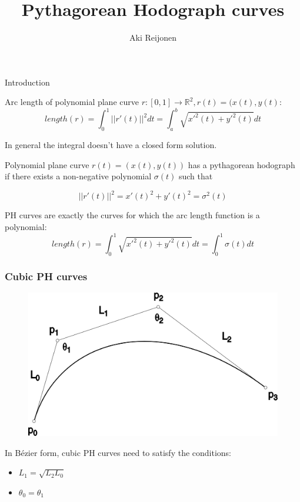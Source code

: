 \documentclass{beamer}
\title{Pythagorean Hodograph curves}
\author{Aki Reijonen}
\begin{document}
\begin{frame}
\titlepage
\end{frame}


%
\begin{frame}{Introduction}

Arc length of polynomial plane curve $r : [0,1] \to \mathbb{R}^2, r(t) = (x(t), y(t)$:
\[
  length(r) = 
\int_0^1 ||r'(t)||^2 dt = \int_a^b \sqrt{x'^2(t) + y'^2(t)} dt
\]

In general the integral doesn't have a closed form solution.

\end{frame}

\begin{frame}

\begin{definition}
Polynomial plane curve $r(t)=(x(t), y(t))$ has a pythagorean hodograph if 
there exists a non-negative polynomial $\sigma(t)$ such that

\[
  ||r'(t)||^2 = x'(t)^2 + y'(t)^2 = \sigma^2(t)
\]
\end{definition}
\pause

PH curves are exactly the curves for which the arc length function is a polynomial:
\[
  length(r) = \int_0^1 \sqrt{x'^2(t) + y'^2(t)} dt = \int_0^1 \sigma(t) dt
\]

\end{frame}

\begin{frame}
\frametitle{Cubic PH curves}

\begin{figure}
\centering
\includegraphics[width=\textwidth]{cubic_ph_bezier.png}
\end{figure}

In Bézier form, cubic PH curves need to satisfy the conditions:
\begin{itemize}
\item $L_1 = \sqrt{L_2 L_0}$
\pause
\item $\theta_0 = \theta_1$
\end{itemize}
\end{frame}
\end{document}
